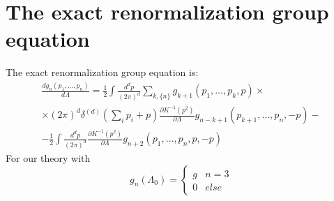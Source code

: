 \documentclass{article}
\begin{document}
\section{The exact renormalization group equation}
The exact renormalization group equation is:
\begin{equation}
\begin{gathered}
    \frac{dg_n(p_1, \dots, p_n)}{d\Lambda} = \frac{1}{2} \int \frac{d^d p}{(2\pi)^d} \sum_{k, \{n\}} g_{k+1} (p_1, \dots, p_{k}, p) \times \\ \times (2\pi)^d \delta^{(d)}\left(\sum_i p_i + p\right) \frac{\partial K^{-1}(p^2)}{\partial\Lambda} g_{n-k+1} (p_{k+1}, \dots, p_n, -p) - \\ -
    \frac{1}{2} \int \frac{d^d p}{(2\pi)^d} \frac{\partial K^{-1}(p^2)}{\partial\Lambda} g_{n+2} (p_1, \dots, p_{n}, p, -p)
\end{gathered}
\end{equation}
For our theory with
\begin{equation}
    g_n(\Lambda_0) = \begin{cases}
        g & n = 3 \\ 0 & else
    \end{cases}
\end{equation}
\end{document}
